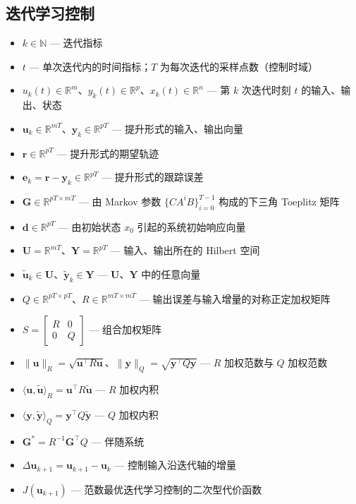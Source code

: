 \subsection*{迭代学习控制}

\begin{itemize}
	\item $k\in\mathbb{N}$ — 迭代指标
	\item $t$ — 单次迭代内的时间指标；$T$ 为每次迭代的采样点数（控制时域）
	\item $u_k(t)\in\mathbb{R}^m$、$y_k(t)\in\mathbb{R}^p$、$x_k(t)\in\mathbb{R}^n$ — 第 $k$ 次迭代时刻 $t$ 的输入、输出、状态
	\item $\mathbf{u}_k\in\mathbb{R}^{mT}$、$\mathbf{y}_k\in\mathbb{R}^{pT}$ — 提升形式的输入、输出向量
	\item $\mathbf{r}\in\mathbb{R}^{pT}$ — 提升形式的期望轨迹
	\item $\mathbf{e}_k = \mathbf{r}-\mathbf{y}_k\in\mathbb{R}^{pT}$ — 提升形式的跟踪误差
	\item $\mathbf{G}\in\mathbb{R}^{pT\times mT}$ — 由 Markov 参数 $\{CA^iB\}_{i=0}^{T-1}$ 构成的下三角 Toeplitz 矩阵
	\item $\mathbf{d}\in\mathbb{R}^{pT}$ — 由初始状态 $x_0$ 引起的系统初始响应向量
	\item $\mathbf{U}=\mathbb{R}^{mT}$、$\mathbf{Y}=\mathbb{R}^{pT}$ — 输入、输出所在的 Hilbert 空间
	\item $\tilde{\mathbf{u}}_k\in\mathbf{U}$、$\tilde{\mathbf{y}}_k\in\mathbf{Y}$ — $\mathbf{U}$、$\mathbf{Y}$ 中的任意向量
	\item $Q\in\mathbb{R}^{pT\times pT}$、$R\in\mathbb{R}^{mT\times mT}$ — 输出误差与输入增量的对称正定加权矩阵
	\item $S = \begin{bmatrix} R & 0 \\ 0 & Q \end{bmatrix}$ — 组合加权矩阵
	\item $\|\mathbf{u}\|_R = \sqrt{\mathbf{u}^\top R\mathbf{u}}$、$\|\mathbf{y}\|_Q = \sqrt{\mathbf{y}^\top Q\mathbf{y}}$ — $R$ 加权范数与 $Q$ 加权范数
	\item $\langle\mathbf{u},\tilde{\mathbf{u}}\rangle_R = \mathbf{u}^\top R\tilde{\mathbf{u}}$ — $R$ 加权内积
	\item $\langle\mathbf{y},\tilde{\mathbf{y}}\rangle_Q = \mathbf{y}^\top Q\tilde{\mathbf{y}}$ — $Q$ 加权内积
	\item $\mathbf{G}^* = R^{-1}\mathbf{G}^\top Q$ — 伴随系统
	\item $\Delta\mathbf{u}_{k+1} = \mathbf{u}_{k+1}-\mathbf{u}_k$ — 控制输入沿迭代轴的增量
	\item $J(\mathbf{u}_{k+1})$ — 范数最优迭代学习控制的二次型代价函数
\end{itemize}

